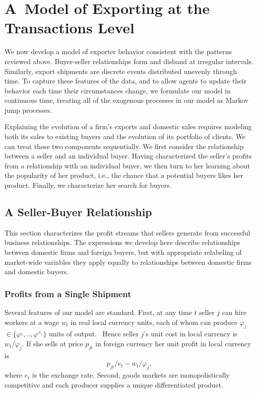 \documentclass[12pt,titlepage]{article}
\begin{document}
\section{A\ Model of Exporting at the Transactions Level}

We now develop a model of exporter behavior consistent with the patterns
reviewed above. Buyer-seller relationships form and disband at irregular
intervals. Similarly, export shipments are discrete events distributed
unevenly through time. To capture these features of the data, and to allow
agents to update their behavior each time their circumstances change, we
formulate our model in continuous time, treating all of the exogenous
processes in our model as Markov jump processes.

Explaining the evolution of a firm's exports and domestic sales requires
modeling both its sales to existing buyers and the evolution of its
portfolio of clients. We can treat these two components sequentially. We
first consider the relationship between a seller and an individual buyer.
Having characterized the seller's profits from a relationship with an
individual buyer, we then turn to her learning about the popularity of her
product, i.e., the chance that a potential buyers likes her product.
Finally, we characterize her search for buyers.

\subsection{A Seller-Buyer Relationship}

This section characterizes the profit streams that sellers generate from
successful business relationships. The expressions we develop here describe
relationships between domestic firms and foreign buyers, but with
appropriate relabeling of market-wide variables they apply equally to
relationships between domestic firms and domestic buyers.

\subsubsection{Profits from a Single Shipment}

Several features of our model are standard. First, at any time $t$ seller $j$
can hire workers at a wage $w_{t}$ in real local currency units, each of
whom can produce $\varphi _{j}$ $\in \{\varphi ^{_{1}},..,\varphi
^{_{N_{\varphi }}}\}$ units of output.\footnotemark{} \ Hence seller $j$'s unit cost in local currency is $%
w_{t}/\varphi _{j}.$ If she sells at price $p_{jt}$ in foreign currency her
unit profit in local currency is%
\begin{equation}
p_{jt}/e_{t}-w_{t}/\varphi _{j},  \label{unit profit}
\end{equation}%
where $e_{t}$ is the exchange rate. Second, goods markets are
monopolistically competitive and each producer supplies a unique
differentiated product.
\end{document}

